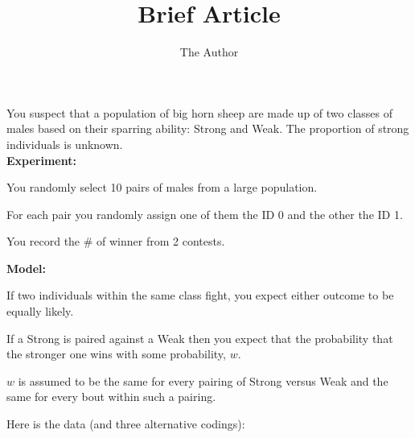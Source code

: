 \documentclass[11pt]{article}
\title{Brief Article}
\author{The Author}
\begin{document}
You suspect that a population of big horn sheep are made up of two classes of males based on their sparring ability: Strong and Weak. The proportion of strong individuals is unknown.\\ {\bf Experiment:}
\begin{compactitem}
	\item You randomly select 10 pairs of males from a large population. 
	\item For each pair you randomly assign one of them the ID 0 and the other the ID 1.  
	\item You record the \# of winner from 2 contests.
\end{compactitem}
{\bf Model:}
\begin{compactitem}
	\item If two individuals within the same class fight, you expect either outcome to be equally likely.
	\item If a Strong is paired against a Weak then you expect that the probability that the stronger one wins with some probability, $w$.
	\item $w$ is assumed to be the same for every pairing of Strong {versus} Weak and the same for every bout within such a pairing.
\end{compactitem}
Here is the data (and three alternative codings):\\
\end{document}
